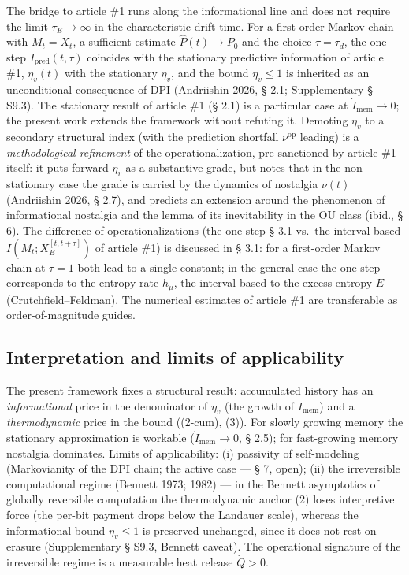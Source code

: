 \documentclass[pdflatex,sn-mathphys-ay]{sn-jnl}
\begin{document}
The bridge to article \#1 runs along the informational line and does not require the limit \(\tau_E \to \infty\) in the characteristic drift time. For a first-order Markov chain with \(M_t = X_t\), a sufficient estimate \(\hat P(t) \to P_0\) and the choice \(\tau = \tau_d\), the one-step \(I_{\text{pred}}(t,\tau)\) coincides with the stationary predictive information of article \#1, \(\eta_v(t)\) with the stationary \(\eta_v\), and the bound \(\eta_v \le 1\) is inherited as an unconditional consequence of DPI (Andriishin 2026, § 2.1; Supplementary § S9.3). The stationary result of article \#1 (§ 2.1) is a particular case at \(\dot I_{\text{mem}} \to 0\); the present work extends the framework without refuting it. Demoting \(\eta_v\) to a secondary structural index (with the prediction shortfall \(\nu^{\text{op}}\) leading) is a \emph{methodological refinement} of the operationalization, pre-sanctioned by article \#1 itself: it puts forward \(\eta_v\) as a substantive grade, but notes that in the non-stationary case the grade is carried by the dynamics of nostalgia \(\nu(t)\) (Andriishin 2026, § 2.7), and predicts an extension around the phenomenon of informational nostalgia and the lemma of its inevitability in the OU class (ibid., § 6). The difference of operationalizations (the one-step § 3.1 vs.~the interval-based \(I(M_t; X_E^{[t,t+\tau]})\) of article \#1) is discussed in § 3.1: for a first-order Markov chain at \(\tau = 1\) both lead to a single constant; in the general case the one-step corresponds to the entropy rate \(h_\mu\), the interval-based to the excess entropy \(E\) (Crutchfield--Feldman). The numerical estimates of article \#1 are transferable as order-of-magnitude guides.



\subsection{Interpretation and limits of applicability}\label{interpretation-and-limits-of-applicability}



The present framework fixes a structural result: accumulated history has an \emph{informational} price in the denominator of \(\eta_v\) (the growth of \(I_{\text{mem}}\)) and a \emph{thermodynamic} price in the bound ((2-cum), (3)). For slowly growing memory the stationary approximation is workable (\(\dot I_{\text{mem}} \to 0\), § 2.5); for fast-growing memory nostalgia dominates. Limits of applicability: (i) passivity of self-modeling (Markovianity of the DPI chain; the active case --- § 7, open); (ii) the irreversible computational regime (Bennett 1973; 1982) --- in the Bennett asymptotics of globally reversible computation the thermodynamic anchor (2) loses interpretive force (the per-bit payment drops below the Landauer scale), whereas the informational bound \(\eta_v \le 1\) is preserved unchanged, since it does not rest on erasure (Supplementary § S9.3, Bennett caveat). The operational signature of the irreversible regime is a measurable heat release \(\dot Q > 0\).
\end{document}
